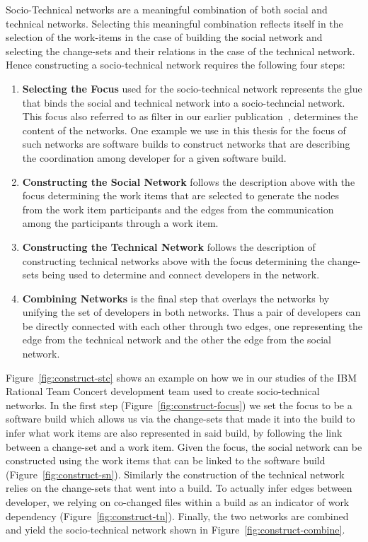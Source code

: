 Socio-Technical networks are a meaningful combination of both social and technical networks.
Selecting this meaningful combination reflects itself in the selection of the work-items in the case of building the social network and selecting the change-sets and their relations in the case of the technical network.
Hence constructing a socio-technical network requires the following four steps:

\begin{enumerate}
\item\textbf{Selecting the Focus} used for the socio-technical network represents the glue that binds the social and technical network into a socio-techncial network. 
This focus also referred to as filter in our earlier publication~\cite{wolf:ieee:2009}, determines the content of the networks.
One example we use in this thesis for the focus of such networks are software builds to construct networks that are describing the coordination among developer for a given software build.
\item\textbf{Constructing the Social Network} follows the description above with the focus determining the work items that are selected to generate the nodes from the work item participants and the edges from the communication among the participants through a work item.
\item\textbf{Constructing the Technical Network} follows the description of constructing technical networks above with the focus determining the change-sets being used to determine and connect developers in the network.
\item\textbf{Combining Networks} is the final step that overlays the networks by unifying the set of developers in both networks.
Thus a pair of developers can be directly connected with each other through two edges, one representing the edge from the technical network and the other the edge from the social network.
\end{enumerate}

Figure~\ref{fig:construct-stc} shows an example on how we in our studies of the IBM Rational Team Concert development team used to create socio-technical networks.
In the first step (Figure~\ref{fig:construct-focus}) we set the focus to be a software build which allows us via the change-sets that made it into the build to infer what work items are also represented in said build, by following the link between a change-set and a work item.
Given the focus, the social network can be constructed using the work items that can be linked to the software build (Figure~\ref{fig:construct-sn}).
Similarly the construction of the technical network relies on the change-sets that went into a build. 
To actually infer edges between developer, we relying on co-changed files within a build as an indicator of work dependency (Figure~\ref{fig:construct-tn}).
Finally, the two networks are combined and yield the socio-technical network shown in Figure~\ref{fig:construct-combine}.

